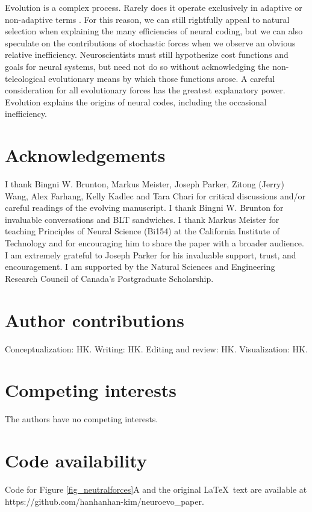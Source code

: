 \documentclass[twocolumn]{article}
\begin{document}
Evolution is a complex process. Rarely does it operate exclusively in adaptive or non-adaptive terms \cite{Gould_Lewontin_1979}. For this reason, we can still rightfully appeal to natural selection when explaining the many efficiencies of neural coding, but we can also speculate on the contributions of stochastic forces when we observe an obvious relative inefficiency. Neuroscientists must still hypothesize cost functions and goals for neural systems, but need not do so without acknowledging the non-teleological evolutionary means by which those functions arose. A careful consideration for all evolutionary forces has the greatest explanatory power. Evolution explains the origins of neural codes, including the occasional inefficiency. 

\newpage
\section*{Acknowledgements}
I thank  Bingni W. Brunton, Markus Meister, Joseph Parker, Zitong (Jerry) Wang, Alex Farhang, Kelly Kadlec and Tara Chari for critical discussions and/or careful readings of the evolving manuscript. I thank Bingni W. Brunton for invaluable conversations and BLT sandwiches. I thank Markus Meister for teaching Principles of Neural Science (Bi154) at the California Institute of Technology and for encouraging him to share the paper with a broader audience. I am extremely grateful to Joseph Parker for his invaluable support, trust, and encouragement. I am supported by the Natural Sciences and Engineering Research Council of Canada's Postgraduate Scholarship. 

\section*{Author contributions}
Conceptualization: HK. Writing: HK. Editing and review: HK. Visualization: HK. 

\section*{Competing interests}
The authors have no competing interests.

\section*{Code availability}
Code for Figure \ref{fig_neutralforces}A and the original \LaTeX \ text are available at https://github.com/hanhanhan-kim/neuroevo\_paper. 

\newpage
 




\end{document}
